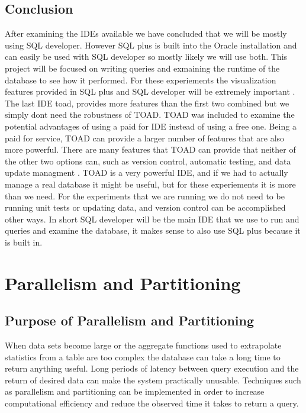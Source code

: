 \documentclass[draftclsnofoot, onecolumn, compsoc, 10pt]{IEEEtran}
\begin{document}
\subsection{Conclusion}
After examining the IDEs available we have concluded that we will be mostly using SQL developer.
However SQL plus is built into the Oracle installation and can easily be used with SQL developer so mostly likely we will use both.
This project will be focused on writing queries and exmaining the runtime of the database to see how it performed.
For these experiements the visualization features provided in SQL plus and SQL developer will be extremely important \cite{SQL Developer Documentation and Release 4.1}.
The last IDE toad, provides more features than the first two combined but we simply dont need the robustness of TOAD.
TOAD was included to examine the potential advantages of using a paid for IDE instead of using a free one. 
Being a paid for service, TOAD can provide a larger number of features that are also more powerful.
There are many features that TOAD can provide that neither of the other two options can, such as version control, automatic testing, and data update managment \cite{Toad For Oracle}.
TOAD is a very powerful IDE, and if we had to actually manage a real database it might be useful, but for these experiements it is more than we need.
For the experiments that we are running we do not need to be running unit tests or updating data, and version control can be accomplished other ways.
In short SQL developer will be the main IDE that we use to run and queries and examine the database, it makes sense to also use SQL plus because it is built in. 

\section{Parallelism and Partitioning}

\subsection{Purpose of Parallelism and Partitioning}
When data sets become large or the aggregate functions used to extrapolate statistics from a table are too complex the database can take a long time to return anything useful.
Long periods of latency between query execution and the return of desired data can make the system practically unusable. 
Techniques such as parallelism and partitioning can be implemented in order to increase computational efficiency and reduce the observed time it takes to return a query. 
\end{document}
